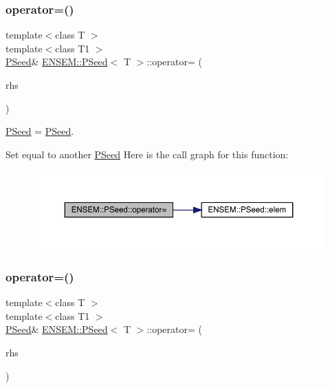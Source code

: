 \subsubsection{\texorpdfstring{operator=()}{operator=()}\hspace{0.1cm}{\footnotesize\ttfamily [5/6]}}
{\footnotesize\ttfamily template$<$class T $>$ \\
template$<$class T1 $>$ \\
\mbox{\hyperlink{classENSEM_1_1PSeed}{P\+Seed}}\& \mbox{\hyperlink{classENSEM_1_1PSeed}{E\+N\+S\+E\+M\+::\+P\+Seed}}$<$ T $>$\+::operator= (\begin{DoxyParamCaption}\item[{const \mbox{\hyperlink{classENSEM_1_1PSeed}{P\+Seed}}$<$ T1 $>$ \&}]{rhs }\end{DoxyParamCaption})\hspace{0.3cm}{\ttfamily [inline]}}



\mbox{\hyperlink{classENSEM_1_1PSeed}{P\+Seed}} = \mbox{\hyperlink{classENSEM_1_1PSeed}{P\+Seed}}. 

Set equal to another \mbox{\hyperlink{classENSEM_1_1PSeed}{P\+Seed}} Here is the call graph for this function\+:
\nopagebreak
\begin{figure}[H]
\begin{center}
\leavevmode
\includegraphics[width=350pt]{dc/d14/classENSEM_1_1PSeed_a22c88645227bfddbfea703ed71117795_cgraph}
\end{center}
\end{figure}
\mbox{\label{classENSEM_1_1PSeed_a22c88645227bfddbfea703ed71117795}} 
\subsubsection{\texorpdfstring{operator=()}{operator=()}\hspace{0.1cm}{\footnotesize\ttfamily [6/6]}}
{\footnotesize\ttfamily template$<$class T $>$ \\
template$<$class T1 $>$ \\
\mbox{\hyperlink{classENSEM_1_1PSeed}{P\+Seed}}\& \mbox{\hyperlink{classENSEM_1_1PSeed}{E\+N\+S\+E\+M\+::\+P\+Seed}}$<$ T $>$\+::operator= (\begin{DoxyParamCaption}\item[{const \mbox{\hyperlink{classENSEM_1_1PSeed}{P\+Seed}}$<$ T1 $>$ \&}]{rhs }\end{DoxyParamCaption})\hspace{0.3cm}{\ttfamily [inline]}}



